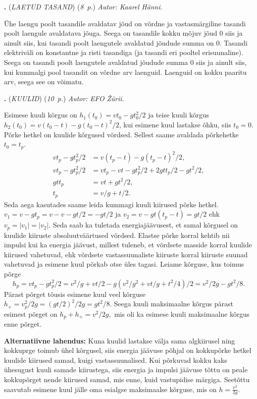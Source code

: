 \documentclass[12pt,a5paper]{article}
\newcommand{\numb}[1]{\vspace{5pt}\textbf{\large #1}}
\newcommand{\nimi}[1]{(\textsl{\small #1})}
\newcommand{\punktid}[1]{(\emph{#1~p.})}
\newcommand{\autor}[1]{\emph{ Autor: #1.}}
\newcounter{ylesanne}
\newcommand{\yl}[1]{\addtocounter{ylesanne}{1}\numb{\theylesanne.} \nimi{#1} \newblock{}}
\begin{document}
\yl{LAETUD TASAND} \punktid{8} \autor{Kaarel Hänni}

Ühe laengu poolt tasandile avaldatav jõud on võrdne ja vastasmärgiline tasandi poolt laengule avaldatava jõuga. Seega on tasandile kokku mõjuv jõud 0 siis ja ainult siis, kui tasandi poolt laengutele avaldatud jõudude summa on 0. Tasandi elektriväli on konstantne ja risti tasandiga (ja tasandi eri pooltel erisuunaline). Seega on tasandi poolt laengutele avaldatud jõudude summa 0 siis ja ainult siis, kui kummalgi pool tasandit on võrdne arv laenguid. Laenguid on kokku paaritu arv, seega see on võimatu.



\yl{KUULID} \punktid{10} \autor{EFO Žürii}

Esimese kuuli kõrgus on \(h_1(t_0) = vt_0 - gt_0^2/2\) ja teise kuuli kõrgus \(h_2(t_0) = v(t_0-t) - g(t_0 - t)^2/2\), kui esimene kuul lastakse õhku, siis \(t_0 = 0\). Põrke hetkel on kuulide kõrgused võrdsed. Sellest saame avaldada põrkehetke \(t_0 = t_p\).
\begin{align*}
    vt_p - gt_p^2/2 &= v(t_p-t) - g(t_p -t)^2/2, \\
    vt_p - gt_p^2/2 &= vt_p - vt - gt_p^2/2 + 2gtt_p/2 - gt^2/2,\\
    gtt_p &= vt + gt^2/2, \\
    t_p &= v/g + t/2.
\end{align*}
Seda aega kasutades saame leida kummagi kuuli kiirused põrke hetkel. \(v_1 = v - gt_p = v - v - gt/2 = -gt/2\) ja \(v_2 = v -gt(t_p-t) = gt/2\) ehk \(v_p = |v_1| = |v_2|\). Seda saab ka tuletada energiajäävusest, et samal kõrgusel on kuulide kiiruste absoluutväärtused võrdsed. Elastse põrke korral kehtib nii impulsi kui ka energia jäävust, millest tuleneb, et võrdsete masside korral kuulide kiirused vahetuvad, ehk võrdsete vastassuunaliste kiiruste korral kiiruste suunad vahetuvad ja esimene kuul põrkab otse üles tagasi. Leiame kõrguse, kus toimus põrge
\[h_p = vt_p - gt_p^2/2 = v^2/g + vt/2 - g(v^2/g^2 + vt/g + t^2/4)/2 = v^2/2g - gt^2/8.\]
Pärast põrget tõusis esimene kuul veel kõrguse \(h_+ = v_p^2/2g = (gt/2)^2/2g = gt^2/8.\) Seega kuuli maksimaalne kõrgus pärast esimest põrget on \(h_p + h_+ = v^2/2g,\) mis oli ka esimese kuuli maksimaalne kõrgus enne põrget.

\textbf{Alternatiivne lahendus:} Kuna kuulid lastakse välja sama algkiirusel ning kokkuprge toimub ühel kõrgusel, siis energia jäävuse põhjal on kokkupõrke hetkel kuulide kiirused samad, kuigi vastassuunalised. Kui põrkuvad kokku kaks ühesugust kuuli samade kiirustega, siis energia ja impulsi jäävuse tõttu on peale kokkupõrget nende kiirused samad, mis enne, kuid vastupidise märgiga. Seetõttu saavutab esimene kuul jälle oma esialgse maksimaalse kõrguse, mis on $h=\frac{v^2}{2g}$.
\end{document}
